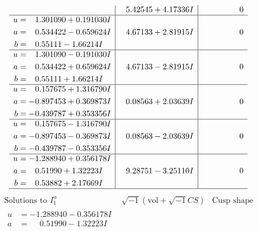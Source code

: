 \documentclass[1p]{elsarticle_modified}
\theoremstyle{definition}
\newcommand{\I}{\sqrt{-1}}
\begin{document}
$$\begin{array}{c|c|c}
 & \phantom{-}5.42545 + 4.17336 I & \phantom{-0.000000 } 0 \\ \hline\begin{aligned}
u &= \phantom{-}1.301090 + 0.191030 I \\
a &= \phantom{-}0.534422 - 0.659624 I \\
b &= \phantom{-}0.55111 - 1.66214 I\end{aligned}
 & \phantom{-}4.67133 + 2.81915 I & \phantom{-0.000000 } 0 \\ \hline\begin{aligned}
u &= \phantom{-}1.301090 - 0.191030 I \\
a &= \phantom{-}0.534422 + 0.659624 I \\
b &= \phantom{-}0.55111 + 1.66214 I\end{aligned}
 & \phantom{-}4.67133 - 2.81915 I & \phantom{-0.000000 } 0 \\ \hline\begin{aligned}
u &= \phantom{-}0.157675 + 1.316790 I \\
a &= -0.897453 + 0.369873 I \\
b &= -0.439787 + 0.353356 I\end{aligned}
 & \phantom{-}0.08563 + 2.03639 I & \phantom{-0.000000 } 0 \\ \hline\begin{aligned}
u &= \phantom{-}0.157675 - 1.316790 I \\
a &= -0.897453 - 0.369873 I \\
b &= -0.439787 - 0.353356 I\end{aligned}
 & \phantom{-}0.08563 - 2.03639 I & \phantom{-0.000000 } 0 \\ \hline\begin{aligned}
u &= -1.288940 + 0.356178 I \\
a &= \phantom{-}0.51990 + 1.32223 I \\
b &= \phantom{-}0.53882 + 2.17669 I\end{aligned}
 & \phantom{-}9.28751 - 3.25110 I & \phantom{-0.000000 } 0\\
 \hline 
 \end{array}$$\newpage$$\begin{array}{c|c|c}  
\text{Solutions to }I^u_{1}& \I (\text{vol} + \sqrt{-1}CS) & \text{Cusp shape}\\
 \hline 
\begin{aligned}
u &= -1.288940 - 0.356178 I \\
a &= \phantom{-}0.51990 - 1.32223 I \\

\end{aligned}
\end{array}$$
\end{document}
